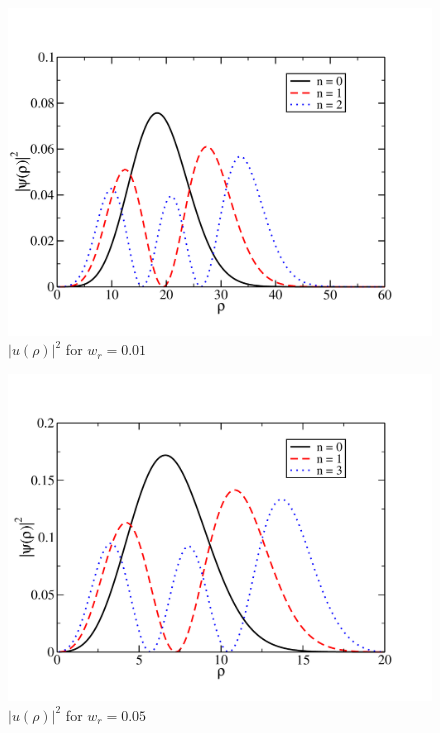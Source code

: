 \documentclass[prc,amsmath,twocolumn,superscriptaddress]{revtex4}
\begin{document}
\begin{figure}[h]
\includegraphics[scale=0.33]{wf_01.pdf}
\caption{$|u(\rho)|^2$ for $w_r = 0.01$}
\label{algorithm}
\end{figure}

\begin{figure}[h]
\includegraphics[scale=0.33]{wf_05.pdf}
\caption{$|u(\rho)|^2$ for $w_r = 0.05$}
\label{algorithm}
\end{figure}
\end{document}
